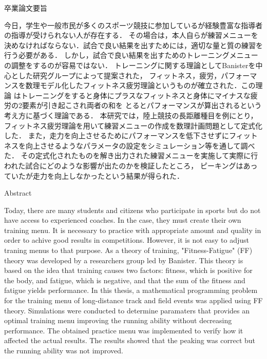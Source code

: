 \documentclass[12pt,fleqn]{jreport}
\begin{document}
\begin{center}
  {\huge 卒業論文要旨}
\end{center}
\vspace{3cm}
\large
今日，学生や一般市民が多くのスポーツ競技に参加しているが経験豊富な指導者の指導が受けられない人が存在する．
その場合は，本人自らが練習メニューを決めなければならない．試合で良い結果を出すためには，適切な量と質の練習を行う必要がある．
しかし，試合で良い結果を出すためのトレーニングメニューの調整をするのが容易ではない．
トレーニングに関する理論としてBanisterを中心とした研究グループによって提案された，
フィットネス，疲労，パフォーマンスを数理モデル化したフィットネス疲労理論というものが確立された．この理論
はトレーニングをすると身体にプラスなフィットネスと身体にマイナスな疲労の2要素が引き起こされ両者の和を
とるとパフォーマンスが算出されるという考え方に基づく理論である．
本研究では，陸上競技の長距離種目を例にとり，フィットネス疲労理論を用いて練習メニューの作成を数理計画問題として定式化した．
また，走力を向上させるためにパフォーマンスを低下させずにフィットネスを向上させるようなパラメータの設定をシミュレーション等を通して調べた．
その定式化されたものを解き出力された練習メニューを実施して実際に行われた試合にどのような影響が出たのかを検証したところ，
ピーキングはあっていたが走力を向上しなかったという結果が得られた．
\newpage
\thispagestyle{empty}

\begin{center}
  {\huge Abstract}
\end{center}
\vspace{3cm}
Today, there are many students and citizens who participate in sports but do not have access to experienced coaches.
In the case, they must create their own training menu.
It is necessary to practice with appropriate amount and quality in order to achive good results in competitions.
However, it is not easy to adjust traning menus to that purpose.
As a theory of training, "Fitness-Fatigue" (FF) theory was developed by a researchers group led by Banister.
This theory is based on the idea that training causes two factors: fitness, which is positive for the body, and fatigue, which is negative, and that the sum of the fitness and fatigue yields performance.
In this thesis, a mathematical programming problem for the training menu of long-distance track and field events was applied using FF theory. Simulations were conducted to determine paramaters that provides an optimal training menu improving the running ability without decreasing performance.
The obtained practice menu was implemented to verify how it affected the actual results. The results showed that the peaking was correct but the running ability was not improved.
\end{document}
